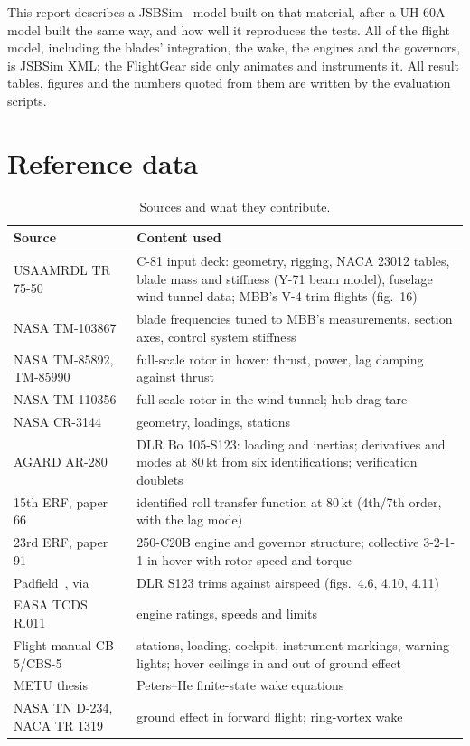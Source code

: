 \documentclass[10pt,a4paper,twocolumn]{article}
\begin{document}
This report describes a JSBSim~\cite{jsbsim} model built on that material, after a UH-60A model built the same way, and how well it
reproduces the tests. All of the flight model, including the blades' integration, the wake, the engines and the governors, is JSBSim
XML; the FlightGear side only animates and instruments it. All result tables, figures and the numbers quoted from them are
written by the evaluation scripts.

\section{Reference data}\label{sec:ref}
\begin{table}[t]
\centering\small
\caption{Sources and what they contribute.}\label{tab:sources}
\begin{tabularx}{\columnwidth}{@{}>{\raggedright\arraybackslash}p{2.55cm}X@{}}
\toprule
Source & Content used \\
\midrule
USAAMRDL TR 75-50~\cite{tr} & C-81 input deck: geometry, rigging, NACA 23012 tables, blade mass and stiffness (Y-71 beam model), fuselage wind tunnel data; MBB's V-4 trim flights (fig.~16) \\
NASA TM-103867~\cite{pt} & blade frequencies tuned to MBB's measurements, section axes, control system stiffness \\
NASA TM-85892, TM-85990~\cite{pw,wp} & full-scale rotor in hover: thrust, power, lag damping against thrust \\
NASA TM-110356~\cite{pm} & full-scale rotor in the wind tunnel; hub drag tare \\
NASA CR-3144~\cite{hf} & geometry, loadings, stations \\
AGARD AR-280~\cite{ar} & DLR Bo 105-S123: loading and inertias; derivatives and modes at 80\,kt from six identifications; verification doublets \\
15th ERF, paper 66~\cite{kal} & identified roll transfer function at 80\,kt (4th/7th order, with the lag mode) \\
23rd ERF, paper 91~\cite{hg} & 250-C20B engine and governor structure; collective 3-2-1-1 in hover with rotor speed and torque \\
Padfield~\cite{pad}, via~\cite{metu} & DLR S123 trims against airspeed (figs.~4.6, 4.10, 4.11) \\
EASA TCDS R.011~\cite{ea} & engine ratings, speeds and limits \\
Flight manual CB-5/CBS-5~\cite{fm} & stations, loading, cockpit, instrument markings, warning lights; hover ceilings in and out of
ground effect \\
METU thesis~\cite{metu} & Peters--He finite-state wake equations \\
NASA TN D-234, NACA TR 1319~\cite{heyson,hk} & ground effect in forward flight; ring-vortex wake \\
\bottomrule
\end{tabularx}
\end{table}
\end{document}

